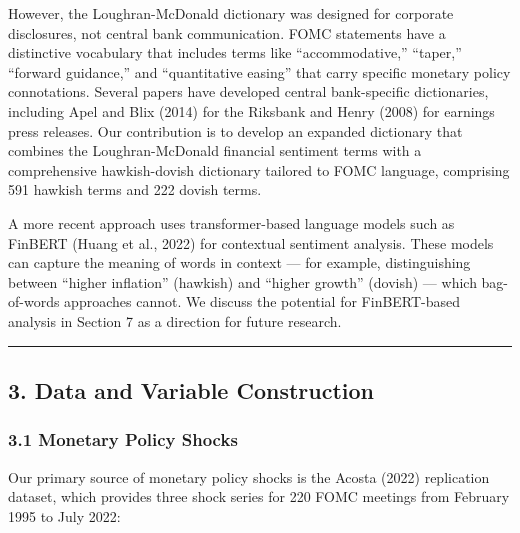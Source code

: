\documentclass[12pt]{article}
\begin{document}
However, the Loughran-McDonald dictionary was designed for corporate
disclosures, not central bank communication. FOMC statements have a
distinctive vocabulary that includes terms like ``accommodative,''
``taper,'' ``forward guidance,'' and ``quantitative easing'' that carry
specific monetary policy connotations. Several papers have developed
central bank-specific dictionaries, including Apel and Blix (2014) for
the Riksbank and Henry (2008) for earnings press releases. Our
contribution is to develop an expanded dictionary that combines the
Loughran-McDonald financial sentiment terms with a comprehensive
hawkish-dovish dictionary tailored to FOMC language, comprising 591
hawkish terms and 222 dovish terms.

A more recent approach uses transformer-based language models such as
FinBERT (Huang et al., 2022) for contextual sentiment analysis. These
models can capture the meaning of words in context --- for example,
distinguishing between ``higher inflation'' (hawkish) and ``higher
growth'' (dovish) --- which bag-of-words approaches cannot. We discuss
the potential for FinBERT-based analysis in Section 7 as a direction for
future research.

\begin{center}\rule{0.5\linewidth}{0.5pt}\end{center}

\subsection{3. Data and Variable
Construction}\label{data-and-variable-construction}

\subsubsection{3.1 Monetary Policy Shocks}\label{monetary-policy-shocks}

Our primary source of monetary policy shocks is the Acosta (2022)
replication dataset, which provides three shock series for 220 FOMC
meetings from February 1995 to July 2022:
\end{document}
